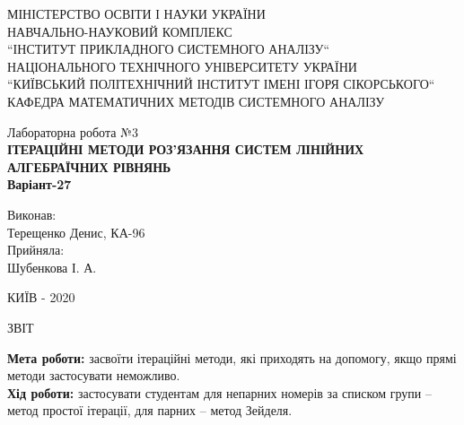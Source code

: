 \documentclass[14pt,a4paper]{scrartcl}
\theoremstyle{definition}
\newtheorem{defo}{Означення}[section]
\theoremstyle{remark}
\theoremstyle{definition}
\theoremstyle{definition}
\begin{document}
\def\be{\begin{equation}}
\def\ee{\end{equation}}

\def\bd{\begin{defo}}
\def\ed{\end{defo}}

\def\bbt{\begin{boxteo}}
\def\ebt{\end{boxteo}}

\begin{titlepage}
\centering
	\vspace{1cm}
	{ МІНІСТЕРСТВО ОСВІТИ І НАУКИ УКРАЇНИ\\
  НАВЧАЛЬНО-НАУКОВИЙ КОМПЛЕКС\\
  ``ІНСТИТУТ ПРИКЛАДНОГО СИСТЕМНОГО АНАЛІЗУ``\\
  НАЦІОНАЛЬНОГО ТЕХНІЧНОГО УНІВЕРСИТЕТУ УКРАЇНИ\\
  ``КИЇВСЬКИЙ ПОЛІТЕХНІЧНИЙ ІНСТИТУТ ІМЕНІ ІГОРЯ СІКОРСЬКОГО``\\
  КАФЕДРА МАТЕМАТИЧНИХ МЕТОДІВ  СИСТЕМНОГО АНАЛІЗУ\\\par}
	\vspace{5cm}
	{\large Лабораторна робота №3 \\
\textbf{ІТЕРАЦІЙНІ МЕТОДИ РОЗ'ЯЗАННЯ СИСТЕМ ЛІНІЙНИХ
АЛГЕБРАЇЧНИХ РІВНЯНЬ\\ Варіант-27} \\ \par}
	\vfill
  \begin{flushright}
  Виконав:\\
   Терещенко Денис, КА-96\\
   Прийняла:\\
   Шубенкова І. А.\\
  \end{flushright}


	\vfill

	{\large КИЇВ - 2020 \par}
\end{titlepage}


\begin{center}
ЗВІТ
\end{center}

\textbf{Мета роботи: } засвоїти ітераційні методи, які приходять на допомогу, якщо прямі методи застосувати неможливо.\\
\textbf{Хід роботи: } застосувати студентам для непарних номерів за списком групи – метод простої ітерації, для парних – метод Зейделя.
\end{document}
